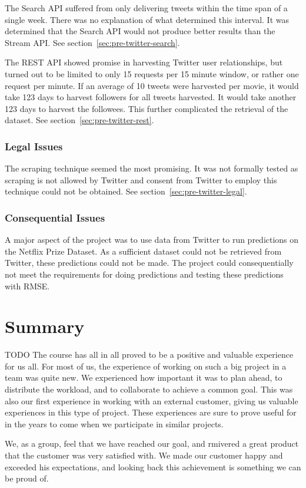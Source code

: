 The Search API suffered from only delivering tweets within the time span of a single week. There was no explanation of what determined this interval. It was determined that the Search API would not produce better results than the Stream API. See section~\ref{sec:pre-twitter-search}.

The REST API showed promise in harvesting Twitter user relationships, but turned out to be limited to only 15 requests per 15 minute window, or rather one request per minute. If an average of 10 tweets were harvested per movie, it would take 123 days to harvest followers for all tweets harvested. It would take another 123 days to harvest the followees. This further complicated the retrieval of the dataset. See section~\ref{sec:pre-twitter-rest}.

\subsubsection{Legal Issues}
The scraping technique seemed the most promising. It was not formally tested as scraping is not allowed by Twitter and consent from Twitter to employ this technique could not be obtained. See section~\ref{sec:pre-twitter-legal}.

\subsubsection{Consequential Issues}
A major aspect of the project was to use data from Twitter to run predictions on the Netflix Prize Dataset. As a sufficient dataset could not be retrieved from Twitter, these predictions could not be made. The project could consequentially not meet the requirements for doing predictions and testing these predictions with RMSE.


\section{Summary}
TODO
The course has all in all proved to be a positive and valuable experience for us all. For most of us, the experience of working on such a big project in a team was quite new. We experienced how important it was to plan ahead, to distribute the workload, and to collaborate to achieve a common goal. This was also our first experience in working with an external customer, giving us valuable experiences in this type of project. These experiences are sure to prove useful for in the years to come when we participate in similar projects.

We, as a group, feel that we have reached our goal, and rmivered a great product that the customer was very satisfied with. We made our customer happy and exceeded his expectations, and looking back this achievement is something we can be proud of.
